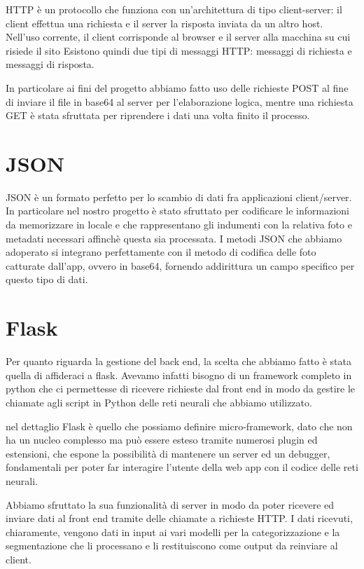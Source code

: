 HTTP è  un protocollo che funziona con un'architettura di tipo client-server: il client effettua una richiesta  e il server la risposta inviata da un altro host.  Nell'uso corrente,  il client corrisponde al browser e il server alla macchina su cui risiede il sito  Esistono  quindi due tipi di messaggi HTTP: messaggi di richiesta e messaggi di risposta. 

In particolare ai fini del progetto abbiamo fatto uso delle richieste POST al fine di inviare il file in base64 al server per l'elaborazione logica, mentre una richiesta GET è stata sfruttata per riprendere i dati una volta finito il processo.

\section{JSON}

JSON è un formato perfetto per lo scambio di dati fra applicazioni client/server. In particolare nel nostro progetto è stato sfruttato per codificare le informazioni da memorizzare in locale e che rappresentano gli indumenti con la relativa foto e metadati necessari affinchè questa sia processata. 
I metodi JSON che abbiamo adoperato si integrano perfettamente con il metodo di codifica delle foto catturate dall'app, ovvero in base64, fornendo addirittura un campo specifico per questo tipo di dati.

\section{Flask}

Per quanto riguarda la gestione del back end, la scelta che abbiamo fatto è stata quella di affideraci a flask. Avevamo infatti bisogno di un framework completo in python che ci permettesse di ricevere richieste dal front end in modo da gestire le chiamate agli script in Python delle reti neurali che abbiamo utilizzato.

nel dettaglio Flask è quello che possiamo definire micro-framework, dato che non ha un nucleo complesso ma può essere esteso tramite numerosi plugin ed estensioni, che espone la possibilità di mantenere un server ed un debugger, fondamentali per poter far interagire l'utente della web app con il codice delle reti neurali.

Abbiamo sfruttato la sua funzionalità di server in modo da poter ricevere ed inviare dati al front end tramite delle chiamate a richieste HTTP. I dati ricevuti, chiaramente, vengono dati in input ai vari modelli per la categorizzazione e la segmentazione che li processano e li restituiscono come output da reinviare al client.


